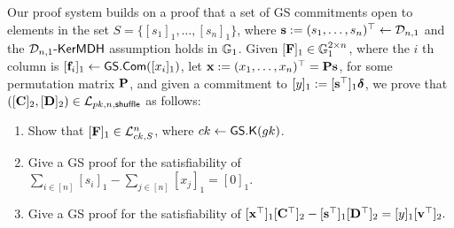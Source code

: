 Our proof system builds on a proof that a set of GS commitments open to elements in the set $S=\{[s_1]_1,\ldots,[s_n]_1\}$, where $\mathbf{s}:=(s_1,\ldots,s_n)^\top\gets\mathcal{D}_{n,1}$ and the $\mathcal{D}_{n,1}\mbox{-}\mathsf{KerMDH}$ assumption holds in $\mathbb{G}_1$. Given $[\mathbf{{F}}]_1\in\mathbb{G}_1^{2\times n}$, where the $i$ th column is $[\mathbf{f}_i]_1\gets{\mathsf{GS}}.\mathsf{Com}([x_i]_1)$, let $\mathbf{x}:=({x}_1,\ldots,{x}_n)^\top=\mathbf{{P}}\mathbf{s}$, for some permutation matrix $\mathbf{{P}}$, and given a commitment to $[y]_1:=[\mathbf{s}^\top]_1{\boldsymbol \delta}$, we prove that $([\mathbf{{C}}]_2,[\mathbf{{D}}]_2)\in\mathcal{L}_{pk,n,\mathsf{shuffle}}$ as follows:
\begin{enumerate}[label=\alph*)]
\item Show that $[\mathbf{{F}}]_1\in\mathcal{L}_{ck,S}^n$, where $ck\gets{\mathsf{GS}}.\mathsf{K}({gk})$.\label{shuffle:a}
\item Give a GS proof for the satisfiability of $\sum_{i\in[n]}[s_i]_1-\sum_{j\in[n]}[{x}_j]_1=[0]_1$.\label{shuffle:b}
\item Give a GS proof for the satisfiability of
$
[\mathbf{x}^\top]_1[\mathbf{{C}}^\top]_2-[\mathbf{s}^\top]_1[\mathbf{{D}}^\top]_2=[y]_1[\mathbf{v}^\top]_2.\label{shuffle:c}
$
\end{enumerate}

